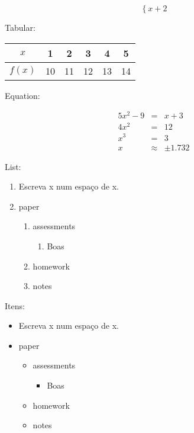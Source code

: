 \documentclass[a4paper,10pt]{article}
\begin{document}
$$\left\{ x+2\right.$$

Tabular:\\
\begin{tabular}{|c|ccccc|}

\hline
 $x$ & 1 & 2 & 3 & 4 & 5  \\\hline
 $f(x)$ & 10 & 11 & 12 & 13 & 14\\ \hline
 
 \end{tabular}

 Equation:
 
 \begin{eqnarray}%
  5x^2-9&=&x+3\\%
  4x^2&=&12\\
  x^3&=&3\\
  x&\approx&\pm1.732
 \end{eqnarray}

 List:
 \begin{enumerate}
  \item Escreva x num espaço de x.
  \item paper
  \begin{enumerate}
   \item assessments
   \begin {enumerate}
   \item Boas
   \end {enumerate}
   \item homework
   \item notes
  \end{enumerate}
 \end{enumerate}  

 Itens:
 \begin{itemize}
  \item Escreva x num espaço de x.
  \item paper
  \begin{itemize}
   \item assessments
   \begin {itemize}
   \item Boas
   \end {itemize}
   \item homework
   \item notes
  \end{itemize}
 \end{itemize}  
\end{document}
